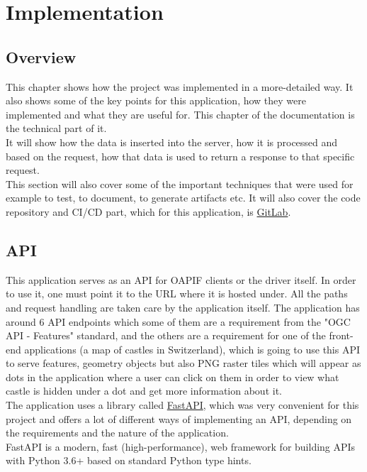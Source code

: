 \chapter{Implementation}

\section{Overview}
This chapter shows how the project was implemented in a more-detailed way. It also shows some of the key points for this application, how they were implemented and what they are useful for. This chapter of the documentation is the technical part of it.\\
It will show how the data is inserted into the server, how it is processed and based on the request, how that data is used to return a response to that specific request.\\
This section will also cover some of the important techniques that were used for example to test, to document, to generate artifacts etc. It will also cover the code repository and CI/CD part, which for this application, is  \href{https://gitlab.com/}{GitLab}.

\section{API}
This application serves as an API for OAPIF clients or the driver itself. In order to use it, one must point it to the URL where it is hosted under. All the paths and request handling are taken care by the application itself. The application has around 6 API endpoints which some of them are a requirement from the "OGC API - Features" standard, and the others are a requirement for one of the front-end applications (a map of castles in Switzerland), which is going to use this API to serve features, geometry objects but also PNG raster tiles which will appear as dots in the application where a user can click on them in order to view what castle is hidden under a dot and get more information about it.\\
The application uses a library called \href{https://fastapi.tiangolo.com/}{FastAPI}, which was very convenient for this project and offers a lot of different ways of implementing an API, depending on the requirements and the nature of the application.\\
\newline
FastAPI is a modern, fast (high-performance), web framework for building APIs with Python 3.6+ based on standard Python type hints.

